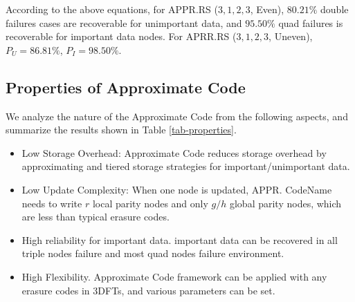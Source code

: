 \documentclass[sigconf]{acmart}
\begin{document}
According to the above equations, for APPR.RS ($3,1,2,3$, Even), $80.21\%$ double failures cases are recoverable for unimportant data, and $95.50\%$ quad failures is recoverable for important data nodes. For APRR.RS ($3,1,2,3$, Uneven), $P_U=86.81\%$, $P_{I}=98.50\%$.

\subsection{Properties of Approximate Code}\label{properties}

We analyze the nature of the Approximate Code from the following aspects, and summarize the results shown in Table \ref{tab-properties}.
\begin{itemize}
    \item Low Storage Overhead: Approximate Code reduces storage overhead by approximating and tiered storage strategies for important/unimportant data. 
    \item Low Update Complexity: When one node is updated, APPR. CodeName needs to write $r$ local parity nodes and only $g/h$ global parity nodes, which are less than typical erasure codes.
    \item High reliability for important data. important data can be recovered in all triple nodes failure and most quad nodes failure environment.
    \item High Flexibility. Approximate Code framework can be applied with any erasure codes in 3DFTs, and various parameters can be set.
\end{itemize}
\end{document}
